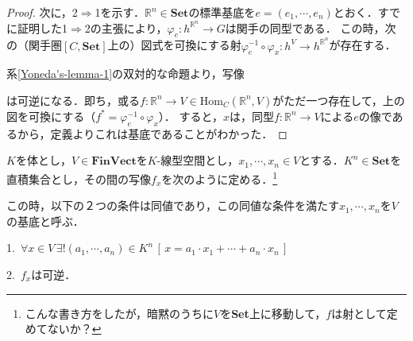 \documentclass[uplatex, 12pt, dvipdfmx]{jsreport}
\begin{document}
\begin{proof}
    次に，2$\Rightarrow$1を示す．$\mathbb{R}^n\in\mathbf{Set}$の標準基底を$e=(e_1,\cdots,e_n)$とおく．すでに証明した1$\Rightarrow$2の主張により，$\varphi_e:h^{\mathbb{R}^n}\to G$は関手の同型である．
    この時，次の（関手圏$[C,\mathbf{Set}]$上の）図式を可換にする射$\varphi_e^{-1}\circ\varphi_x:h^V\to h^{\mathbb{R}^n}$が存在する．
    \begin{center}\end{center}
    系\ref{Yoneda's-lemma-1}の双対的な命題より，写像
    \begin{center}\end{center}
    は可逆になる．即ち，或る$f:\mathbb{R}^n\to V\in\mathrm{Hom}_C(\mathbb{R}^n,V)$がただ一つ存在して，上の図を可換にする（$f^*=\varphi_e^{-1}\circ\varphi_x$）．
    すると，$x$は，同型$f:\mathbb{R}^n\to V$による$e$の像であるから，定義よりこれは基底であることがわかった．
\end{proof}
\begin{shadebox}\begin{definition}[基底の定義（参考）]\rm{}
    $K$を体とし，$V\in\mathbf{FinVect}$を$K$-線型空間とし，$x_1,\cdots,x_n\in V$とする．$K^n\in\mathbf{Set}$を直積集合とし，その間の写像$f_x$を次のように定める．\footnote{こんな書き方をしたが，暗黙のうちに$V$を\textbf{Set}上に移動して，$f$は射として定めてないか？}
    \begin{center}\end{center}
    この時，以下の２つの条件は同値であり，この同値な条件を満たす$x_1,\cdots,x_n$を$V$の基底と呼ぶ．

    1.\, $\forall x\in V\, \exists ! (a_1,\cdots,a_n)\in K^n \, [\, x=a_1\cdot x_1+\cdots +a_n\cdot x_n \,]$

    2.\, $f_x$は可逆．
\end{definition}\end{shadebox}
\end{document}
